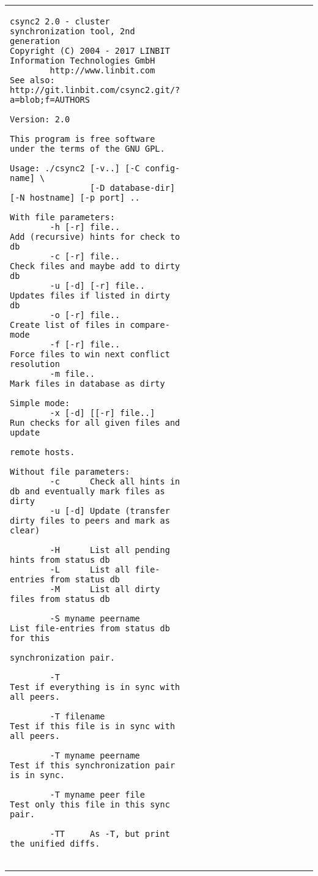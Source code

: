\documentclass[a4paper,twocolumn]{article}
\begin{document}
\begin{figure*}[t]
  \begin{center}
    \begin{tabular}{|p{0.5\linewidth}|p{0.5\linewidth}|}
      \hline
\begin{tiny}
\begin{verbatim}
csync2 2.0 - cluster synchronization tool, 2nd generation
Copyright (C) 2004 - 2017 LINBIT Information Technologies GmbH
        http://www.linbit.com
See also: http://git.linbit.com/csync2.git/?a=blob;f=AUTHORS

Version: 2.0

This program is free software under the terms of the GNU GPL.

Usage: ./csync2 [-v..] [-C config-name] \
                [-D database-dir] [-N hostname] [-p port] ..

With file parameters:
        -h [-r] file..          Add (recursive) hints for check to db
        -c [-r] file..          Check files and maybe add to dirty db
        -u [-d] [-r] file..     Updates files if listed in dirty db
        -o [-r] file..          Create list of files in compare-mode
        -f [-r] file..          Force files to win next conflict resolution
        -m file..               Mark files in database as dirty

Simple mode:
        -x [-d] [[-r] file..]   Run checks for all given files and update
                                remote hosts.

Without file parameters:
        -c      Check all hints in db and eventually mark files as dirty
        -u [-d] Update (transfer dirty files to peers and mark as clear)

        -H      List all pending hints from status db
        -L      List all file-entries from status db
        -M      List all dirty files from status db

        -S myname peername      List file-entries from status db for this
                                synchronization pair.

        -T                      Test if everything is in sync with all peers.

        -T filename             Test if this file is in sync with all peers.

        -T myname peername      Test if this synchronization pair is in sync.

        -T myname peer file     Test only this file in this sync pair.

        -TT     As -T, but print the unified diffs.


\end{verbatim}
\end{tiny}
\end{tabular}
\end{center}
\end{figure*}
\end{document}
